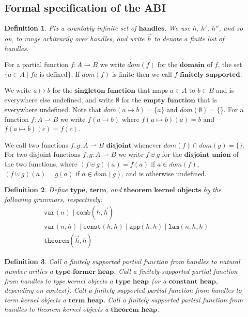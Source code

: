 \documentclass[a4paper, 10pt]{article}
\newtheorem{definition}{Definition}[section]
\newcommand{\deffont}[1]{\ensuremath{\textbf{#1}}}
\begin{document}
\subsection{Formal specification of the ABI}
\label{subsect.formal.specification.of.the.abi}

\begin{definition}
\label{defn.handle}
Fix a countably infinite set of \deffont{handles}.
We use $h$, $h'$, $h''$, and so on, to range arbitrarily over handles, and write $\vec{h}$ to denote a finite list of handles.
\end{definition}

For a partial function $f : A \rightharpoonup B$ we write $dom(f)$ for the \deffont{domain} of $f$, the set $\{ a \in A \mid f a \text{ is defined} \}$.
If $dom(f)$ is finite then we call $f$ \deffont{finitely supported}.

We write $a \mapsto b$ for the \deffont{singleton function} that maps $a \in A$ to $b \in B$ and is everywhere else undefined, and write $\emptyset$ for the \deffont{empty function} that is everywhere undefined.
Note that $dom(a \mapsto b) = \{a \}$ and $dom(\emptyset) = \{\}$.
For a function $f : A \rightharpoonup B$ we write $f(a \mapsto b)$ where $f(a \mapsto b)(a) = b$ and $f(a \mapsto b)(c) = f(c)$.

We call two functions $f, g : A \rightharpoonup B$ \deffont{disjoint} whenever $dom(f) \cap dom(g) = \{\}$.
For two disjoint functions $f, g : A \rightharpoonup B$ we write $f \uplus g$ for the \deffont{disjoint union} of the two functions, where $(f \uplus g)(a) = f(a)$ if $a \in dom(f)$, $(f \uplus g)(a) = g(a)$ if $a \in dom(g)$, and is otherwise undefined.

\begin{definition}
\label{defn.kernel.objects}
Define \deffont{type}, \deffont{term}, and \deffont{theorem kernel objects} by the following grammars, respectively:
\begin{gather*}
\mathtt{var}(n) \mid \mathtt{comb}(h, \vec{h}) \\
\mathtt{var}(n, h) \mid \mathtt{const}(h, h) \mid \mathtt{app}(h, h) \mid \mathtt{lam}(n, h, h) \\
\mathtt{theorem}(\vec{h}, h)
\end{gather*}
\end{definition}

\begin{definition}
\label{defn.heaps}
Call a finitely supported partial function from handles to natural number arities a \deffont{type-former heap}.
Call a finitely-supported partial function from handles to type kernel objects a \deffont{type heap} (or a \deffont{constant heap}, depending on context).
Call a finitely supported partial function from handles to term kernel objects a \deffont{term heap}.
Call a finitely supported partial function from handles to theorem kernel objects a \deffont{theorem heap}.
\end{definition}
\end{document}
